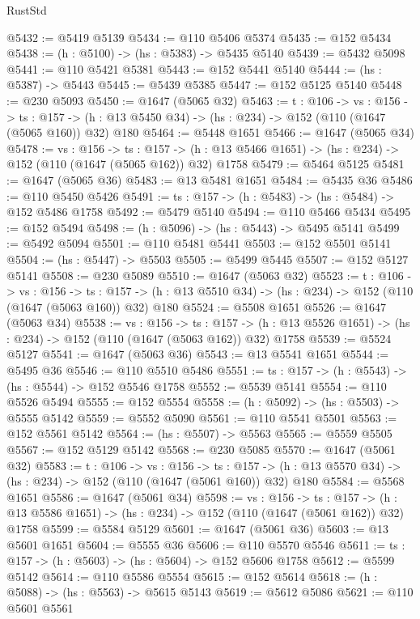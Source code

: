 \begin{lexlean}{RustStd}
\begin{coremodule}
@5432 := @5419 @5139
@5434 := @110 @5406 @5374
@5435 := @152 @5434
@5438 := (h : @5100) -> (hs : @5383) -> @5435 @5140
@5439 := @5432 @5098
@5441 := @110 @5421 @5381
@5443 := @152 @5441 @5140
@5444 := (hs : @5387) -> @5443
@5445 := @5439 @5385
@5447 := @152 @5125 @5140
@5448 := @230 @5093
@5450 := @1647 (@5065 @32)
@5463 := {t : @106} ->
  {vs : @156} ->
  {ts : @157} -> (h : @13 @5450 @34) -> (hs : @234) -> @152 (@110 (@1647 (@5065 @160)) @32) @180
@5464 := @5448 @1651
@5466 := @1647 (@5065 @34)
@5478 := {vs : @156} ->
  {ts : @157} -> (h : @13 @5466 @1651) -> (hs : @234) -> @152 (@110 (@1647 (@5065 @162)) @32) @1758
@5479 := @5464 @5125
@5481 := @1647 (@5065 @36)
@5483 := @13 @5481 @1651
@5484 := @5435 @36
@5486 := @110 @5450 @5426
@5491 := {ts : @157} -> (h : @5483) -> (hs : @5484) -> @152 @5486 @1758
@5492 := @5479 @5140
@5494 := @110 @5466 @5434
@5495 := @152 @5494
@5498 := (h : @5096) -> (hs : @5443) -> @5495 @5141
@5499 := @5492 @5094
@5501 := @110 @5481 @5441
@5503 := @152 @5501 @5141
@5504 := (hs : @5447) -> @5503
@5505 := @5499 @5445
@5507 := @152 @5127 @5141
@5508 := @230 @5089
@5510 := @1647 (@5063 @32)
@5523 := {t : @106} ->
  {vs : @156} ->
  {ts : @157} -> (h : @13 @5510 @34) -> (hs : @234) -> @152 (@110 (@1647 (@5063 @160)) @32) @180
@5524 := @5508 @1651
@5526 := @1647 (@5063 @34)
@5538 := {vs : @156} ->
  {ts : @157} -> (h : @13 @5526 @1651) -> (hs : @234) -> @152 (@110 (@1647 (@5063 @162)) @32) @1758
@5539 := @5524 @5127
@5541 := @1647 (@5063 @36)
@5543 := @13 @5541 @1651
@5544 := @5495 @36
@5546 := @110 @5510 @5486
@5551 := {ts : @157} -> (h : @5543) -> (hs : @5544) -> @152 @5546 @1758
@5552 := @5539 @5141
@5554 := @110 @5526 @5494
@5555 := @152 @5554
@5558 := (h : @5092) -> (hs : @5503) -> @5555 @5142
@5559 := @5552 @5090
@5561 := @110 @5541 @5501
@5563 := @152 @5561 @5142
@5564 := (hs : @5507) -> @5563
@5565 := @5559 @5505
@5567 := @152 @5129 @5142
@5568 := @230 @5085
@5570 := @1647 (@5061 @32)
@5583 := {t : @106} ->
  {vs : @156} ->
  {ts : @157} -> (h : @13 @5570 @34) -> (hs : @234) -> @152 (@110 (@1647 (@5061 @160)) @32) @180
@5584 := @5568 @1651
@5586 := @1647 (@5061 @34)
@5598 := {vs : @156} ->
  {ts : @157} -> (h : @13 @5586 @1651) -> (hs : @234) -> @152 (@110 (@1647 (@5061 @162)) @32) @1758
@5599 := @5584 @5129
@5601 := @1647 (@5061 @36)
@5603 := @13 @5601 @1651
@5604 := @5555 @36
@5606 := @110 @5570 @5546
@5611 := {ts : @157} -> (h : @5603) -> (hs : @5604) -> @152 @5606 @1758
@5612 := @5599 @5142
@5614 := @110 @5586 @5554
@5615 := @152 @5614
@5618 := (h : @5088) -> (hs : @5563) -> @5615 @5143
@5619 := @5612 @5086
@5621 := @110 @5601 @5561

\end{coremodule}
\end{lexlean}
